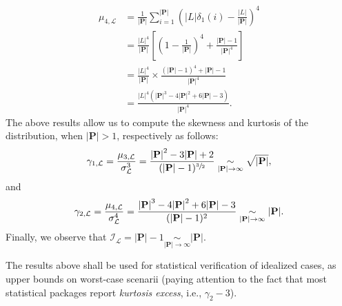 \begin{align*}
\mu_{4,\mathcal{L}}
&= \frac{1}{{\vert\mathbf{P}\vert}}\sum_{i=1}^{\vert\mathbf{P}\vert}\left(
\vert{L}\vert\delta_1(i) - \frac{\vert{L}\vert}{{\vert\mathbf{P}\vert}}\right)^4\\
&= \frac{\vert{L}\vert^4}{{\vert\mathbf{P}\vert}}\left[\left(
1 - \frac{1}{{\vert\mathbf{P}\vert}}\right)^4 +\frac{{\vert\mathbf{P}\vert}-1}{{\vert\mathbf{P}\vert}^4}\right]\\
&= \frac{\vert{L}\vert^4}{{\vert\mathbf{P}\vert}}\times\frac{({\vert\mathbf{P}\vert} - 1)^4 + {\vert\mathbf{P}\vert} - 1}{{\vert\mathbf{P}\vert}^4}\\
&= \frac{\vert{L}\vert^4\left({\vert\mathbf{P}\vert}^3 -
4{\vert\mathbf{P}\vert}^2 + 6{\vert\mathbf{P}\vert} - 3\right)}
{{\vert\mathbf{P}\vert}^4}.
\end{align*}
The above results allow us to compute the skewness and kurtosis of the
distribution, when ${\vert\mathbf{P}\vert}>1$, respectively as follows:
\[
\gamma_{1,\mathcal{L}}
= \frac{\mu_{3,\mathcal{L}}}{\sigma_{\mathcal{L}}^3}\\
= \frac{{\vert\mathbf{P}\vert}^2 - 3{\vert\mathbf{P}\vert} + 2}{({\vert\mathbf{P}\vert}-1)^{\sfrac{3}{2}}}
\underset{{\vert\mathbf{P}\vert}\to\infty}{\sim}\sqrt{{\vert\mathbf{P}\vert}},
\]
and
\[
\gamma_{2,\mathcal{L}}
= \frac{\mu_{4,\mathcal{L}}}{\sigma_{\mathcal{L}}^4}\\
= \frac{{\vert\mathbf{P}\vert}^3 - 4{\vert\mathbf{P}\vert}^2 + 6{\vert\mathbf{P}\vert} -3}{({\vert\mathbf{P}\vert} - 1)^2}
\underset{{\vert\mathbf{P}\vert}\to\infty}{\sim}{\vert\mathbf{P}\vert}.
\]
Finally, we observe that 
$\mathcal{I}_{\mathcal{L}}= {\vert\mathbf{P}\vert}-1\underset{{\vert\mathbf{P}\vert}\to\infty}{\sim}{\vert\mathbf{P}\vert}$.

The results above shall be used for statistical verification of
idealized cases, as upper bounds on worst-case scenarii (paying
attention to the fact that most statistical packages report
\emph{kurtosis excess}, i.e., $\gamma_2-3$).

